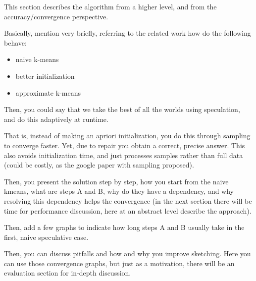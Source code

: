 This section describes the algorithm from a higher level, and from the accuracy/convergence perspective. 

Basically, mention very briefly, referring to the related work how do the following behave:
\begin{itemize}
    \item naive k-means
    \item better initialization
    \item approximate k-means
\end{itemize}

Then, you could say that we take the best of all the worlds using speculation, and do this adaptively at runtime.

That is, instead of making an apriori initialization, you do this through sampling to converge faster. Yet, due to repair you obtain a correct, precise answer. This also avoids initialization time, and just processes samples rather than full data (could be costly, as the google paper with sampling proposed). 

Then, you present the solution step by step, how you start from the naive kmeans, what are steps A and B, why do they have a dependency, and why resolving this dependency helps the convergence (in the next section there will be time for performance discussion, here at an abstract level describe the approach).

Then, add a few graphs to indicate how long steps A and B usually take in the first, naive speculative case.

Then, you can discuss pitfalls and how and why you improve sketching. Here you can use those convergence graphs, but just as a motivation, there will be an evaluation section for in-depth discussion.